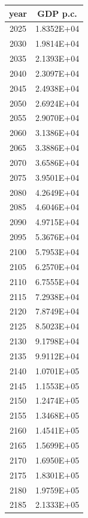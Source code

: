 \documentclass[a4paper]{article}
\begin{document}
	\pagebreak
	
	\small
	
	\noindent
	\begin{tabular}{|c|c|}
		\hline
		year & GDP p.c. \\
		\hline
		2025 & 1.8352E+04 \\
		\hline
		2030 & 1.9814E+04 \\
		\hline
		2035 & 2.1393E+04 \\
		\hline
		2040 & 2.3097E+04 \\
		\hline
		2045 & 2.4938E+04 \\
		\hline
		2050 & 2.6924E+04 \\
		\hline
		2055 & 2.9070E+04 \\
		\hline
		2060 & 3.1386E+04 \\
		\hline
		2065 & 3.3886E+04 \\
		\hline
		2070 & 3.6586E+04 \\
		\hline
		2075 & 3.9501E+04 \\
		\hline
		2080 & 4.2649E+04 \\
		\hline
		2085 & 4.6046E+04 \\
		\hline
		2090 & 4.9715E+04 \\
		\hline
		2095 & 5.3676E+04 \\
		\hline
		2100 & 5.7953E+04 \\
		\hline
		2105 & 6.2570E+04 \\
		\hline
		2110 & 6.7555E+04 \\
		\hline
		2115 & 7.2938E+04 \\
		\hline
		2120 & 7.8749E+04 \\
		\hline
		2125 & 8.5023E+04 \\
		\hline
		2130 & 9.1798E+04 \\
		\hline
		2135 & 9.9112E+04 \\
		\hline
		2140 & 1.0701E+05 \\
		\hline
		2145 & 1.1553E+05 \\
		\hline
		2150 & 1.2474E+05 \\
		\hline
		2155 & 1.3468E+05 \\
		\hline
		2160 & 1.4541E+05 \\
		\hline
		2165 & 1.5699E+05 \\
		\hline
		2170 & 1.6950E+05 \\
		\hline
		2175 & 1.8301E+05 \\
		\hline
		2180 & 1.9759E+05 \\
		\hline
		2185 & 2.1333E+05 \\

\end{tabular}
\end{document}
